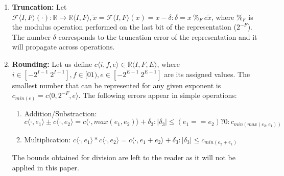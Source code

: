 \documentclass[runningheads,a4paper]{llncs}
\begin{document}
\begin{enumerate}
\item {\bf Truncation:}
Let $\mathcal{F}\langle I,F \rangle(\cdot) : \mathbb{R} \rightarrow \mathbb{R}\langle I,F \rangle, \tilde x=\mathcal{F}\langle I,F \rangle(x) = x-\delta : \delta=x\ \%_F\  c\tilde x$, where $\%_F$ is the modulus operation performed on the last bit of the representation ($2^{-F}$).
The number $\delta$ corresponds to the truncation error of the representation and it will propagate across operations.
\item {\bf Rounding:}
Let us define $c\langle i,f,e \rangle \in \mathbb{R}\langle I,F,E\rangle$, where $i \in [-2^{I-1}\ 2^{I-1}],f \in [0 1),e \in [-2^{E-1}\ 2^{E-1}]$ are its assigned values. The smallest number that can be represented for any given exponent is $c_{min(e)}=c\langle 0,2^{-F},e\rangle$.
The following errors appear in simple operations:
\begin{enumerate}
\item Addition/Substraction: $c\langle \cdot,e_1\rangle \pm c\langle \cdot,e_2\rangle=c\langle \cdot,max(e_1,e_2)\rangle + \delta_3 : |\delta_3| \leq (e_1==e_2) ? 0 : c_{min(max(e_2,e_1))}$ 
\item Multiplication: $c\langle \cdot,e_1\rangle * c\langle \cdot,e_2\rangle=c\langle \cdot,e_1+e_2\rangle + \delta_3 : |\delta_3| \leq c_{min(e_2+e_1)}$
\end{enumerate}
The bounds obtained for division are left to the reader as it will not be applied in this paper.


\end{enumerate}
\end{document}
